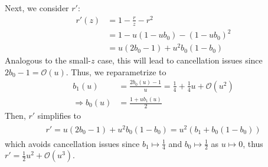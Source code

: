 \documentclass{article}
\begin{document}
Next, we consider $r'$:
%
\begin{align}
  r'(z) & = 1 - \frac{r}{z} - r^2                                                     \\
        & = 1 - u(1 - u b_0) - (1 - u b_0)^2                                          \\
        & = u (2 b_0 - 1) + u^2 b_0 (1 - b_0) \label{eq:r-prime-large-reparametrized}
\end{align}
%
Analogous to the small-$z$ case, this will lead to cancellation issues since $2 b_0 - 1 = \mathcal{O}(u)$.
Thus, we reparametrize to
%
\begin{align}
  b_1(u)             & = \frac{2 b_0(u)-1}{u} = \frac{1}{4} + \frac{1}{4} u + \mathcal{O}(u^2) \\
  \Rightarrow b_0(u) & = \frac{1 + u b_1(u)}{2}
\end{align}
%
Then, $r'$ simplifies to
%
\begin{align}
  \boxed{
    \begin{aligned}
      r' = u(2 b_0-1) + u^2 b_0(1-b_0) = u^2 (b_1 + b_0(1-b_0)) \label{eq:r-prime-large-reparametrized-simplified}
    \end{aligned}
  }
\end{align}
%
which avoids cancellation issues since $b_1 \mapsto \frac{1}{4}$ and $b_0 \mapsto \frac{1}{2}$ as $u \mapsto 0$, thus $r' = \frac{1}{2} u^2 + \mathcal{O}(u^3)$.
\end{document}
